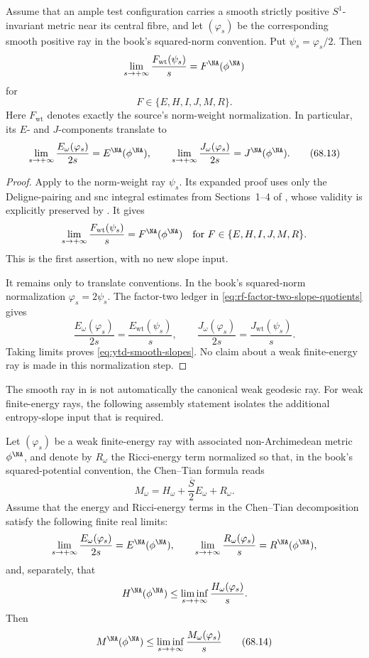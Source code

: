 \begin{theorem}\label{thm:ytd-smooth-functional-slopes}
Assume that an ample test configuration carries a smooth strictly
positive $S^1$-invariant metric near its central fibre, and let
$(\varphi_s)$ be the corresponding smooth positive ray in the book's
squared-norm convention.  Put $\psi_s=\varphi_s/2$.  Then
\[
 \lim_{s\to+\infty}\frac{F_{\mathrm{wt}}(\psi_s)}s
                  =F^{\NA}(\phi^{\NA})
\]
for
\[
                       F\in\{E,H,I,J,M,R\}.
\]
Here $F_{\mathrm{wt}}$ denotes exactly the source's norm-weight
normalization.  In particular, its $E$- and $J$-components translate to
\[
 \lim_{s\to+\infty}\frac{E_\omega(\varphi_s)}{2s}
       =E^{\NA}(\phi^{\NA}),
 \qquad
 \lim_{s\to+\infty}\frac{J_\omega(\varphi_s)}{2s}
       =J^{\NA}(\phi^{\NA}).
\tag{68.13}\label{eq:ytd-smooth-slopes}
\]
\end{theorem}

\begin{proof}
Apply  to the norm-weight ray
$\psi_s$. Its expanded proof uses only the Deligne-pairing and snc
integral estimates from Sections~1--4 of \cite{BHJ19}, whose validity is
explicitly preserved by \cite{BHJ19err}. It gives
\[
 \lim_{s\to+\infty}\frac{F_{\mathrm{wt}}(\psi_s)}s
        =F^{\NA}(\phi^{\NA})
 \quad\text{for }F\in\{E,H,I,J,M,R\}.
\]
This is the first assertion, with no new slope input.

It remains only to translate conventions. In the book's squared-norm
normalization $\varphi_s=2\psi_s$. The factor-two ledger in
\eqref{eq:rf-factor-two-slope-quotients} gives
\[
 \frac{E_\omega(\varphi_s)}{2s}
       =\frac{E_{\mathrm{wt}}(\psi_s)}s,
 \qquad
 \frac{J_\omega(\varphi_s)}{2s}
       =\frac{J_{\mathrm{wt}}(\psi_s)}s.
\]
Taking limits proves \eqref{eq:ytd-smooth-slopes}. No claim about a weak
finite-energy ray is made in this normalization step.
\end{proof}

The smooth ray in
 is not automatically
the canonical weak geodesic ray. For weak finite-energy rays, the
following assembly statement isolates the additional entropy-slope input
that is required.

\begin{proposition}\label{prop:ytd-mabuchi-liminf}
Let $(\varphi_s)$ be a weak finite-energy ray with associated
non-Archimedean metric $\phi^{\NA}$, and denote by $R_\omega$ the
Ricci-energy term normalized so that, in the book's squared-potential
convention, the Chen--Tian formula reads
\[
 M_\omega=H_\omega+\frac{\overline S}{2}E_\omega+R_\omega.
\]
Assume that the energy and
Ricci-energy terms in the Chen--Tian decomposition satisfy the following
finite real limits:
\[
 \lim_{s\to+\infty}\frac{E_\omega(\varphi_s)}{2s}
      =E^{\NA}(\phi^{\NA}),
 \qquad
 \lim_{s\to+\infty}\frac{R_\omega(\varphi_s)}s
      =R^{\NA}(\phi^{\NA}),
\]
and, separately, that
\[
 H^{\NA}(\phi^{\NA})
       \leq
 \liminf_{s\to+\infty}\frac{H_\omega(\varphi_s)}s.
\]
Then
\[
       M^{\NA}(\phi^{\NA})
          \leq
       \liminf_{s\to+\infty}\frac{M_\omega(\varphi_s)}s
\tag{68.14}\label{eq:ytd-mabuchi-liminf}
\]
\end{proposition}

